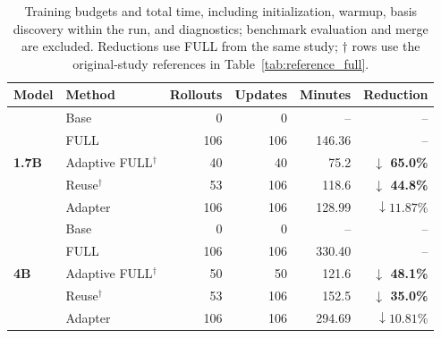 \begin{table}[!t]
\centering
\caption{Training budgets and total time, including initialization, warmup, basis discovery within the run, and diagnostics; benchmark evaluation and merge are excluded. Reductions use FULL from the same study; $\dagger$ rows use the original-study references in Table~\ref{tab:reference_full}.}
\label{tab:representation_time_summary}
\small
\setlength{\tabcolsep}{4pt}
\renewcommand{\arraystretch}{1.12}
\begin{tabular}{llrrrr}
\toprule
Model & Method & Rollouts & Updates & Minutes & Reduction \\
\midrule
\multirow{5}{*}{\textbf{1.7B}} & Base & 0 & 0 & -- & -- \\
 & FULL & 106 & 106 & 146.36 & -- \\
 & Adaptive FULL$^{\dagger}$ & 40 & 40 & 75.2 & \textbf{$\downarrow$ 65.0\%} \\
 & Reuse$^{\dagger}$ & 53 & 106 & 118.6 & \textbf{$\downarrow$ 44.8\%} \\
 & Adapter & 106 & 106 & 128.99 & $\boldsymbol{\downarrow 11.87\%}$ \\
\midrule
\multirow{5}{*}{\textbf{4B}} & Base & 0 & 0 & -- & -- \\
 & FULL & 106 & 106 & 330.40 & -- \\
 & Adaptive FULL$^{\dagger}$ & 50 & 50 & 121.6 & \textbf{$\downarrow$ 48.1\%} \\
 & Reuse$^{\dagger}$ & 53 & 106 & 152.5 & \textbf{$\downarrow$ 35.0\%} \\
 & Adapter & 106 & 106 & 294.69 & $\boldsymbol{\downarrow 10.81\%}$ \\
\bottomrule
\end{tabular}
\end{table}
